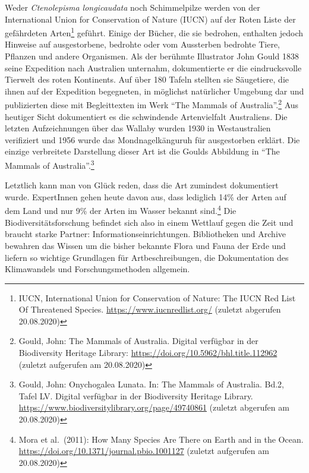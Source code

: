 \documentclass[a4paper,
fontsize=11pt,
oneside,
numbers=noperiodatend,
parskip=half-,
bibliography=totoc,
final
]{scrartcl}
\begin{document}
Weder \emph{Ctenolepisma longicaudata} noch Schimmelpilze werden von der
International Union for Conservation of Nature (IUCN) auf der Roten
Liste der gefährdeten Arten\footnote{IUCN, International Union for
  Conservation of Nature: The IUCN Red List Of Threatened Species.
  \url{https://www.iucnredlist.org/} (zuletzt abgerufen 20.08.2020)}
geführt. Einige der Bücher, die sie bedrohen, enthalten jedoch Hinweise
auf ausgestorbene, bedrohte oder vom Aussterben bedrohte Tiere, Pflanzen
und andere Organismen. Als der berühmte Illustrator John Gould 1838
seine Expedition nach Australien unternahm, dokumentierte er die
eindrucksvolle Tierwelt des roten Kontinents. Auf über 180 Tafeln
stellten sie Säugetiere, die ihnen auf der Expedition begegneten, in
möglichst natürlicher Umgebung dar und publizierten diese mit
Begleittexten im Werk \enquote{The Mammals of Australia}.\footnote{Gould,
  John: The Mammals of Australia. Digital verfügbar in der Biodiversity
  Heritage Library: \url{https://doi.org/10.5962/bhl.title.112962}
  (zuletzt aufgerufen am 20.08.2020)} Aus heutiger Sicht dokumentiert es
die schwindende Artenvielfalt Australiens. Die letzten Aufzeichnungen
über das Wallaby wurden 1930 in Westaustralien verifiziert und 1956
wurde das Mondnagelkänguruh für ausgestorben erklärt. Die einzige
verbreitete Darstellung dieser Art ist die Goulds Abbildung in
\enquote{The Mammals of Australia}.\footnote{Gould, John: Onychogalea
  Lunata. In: The Mammals of Australia. Bd.2, Tafel LV. Digital
  verfügbar in der Biodiversity Heritage Library.
  \url{https://www.biodiversitylibrary.org/page/49740861} (zuletzt
  abgerufen am 20.08.2020)}

Letztlich kann man von Glück reden, dass die Art zumindest dokumentiert
wurde. ExpertInnen gehen heute davon aus, dass lediglich 14\% der Arten
auf dem Land und nur 9\% der Arten im Wasser bekannt sind.\footnote{Mora
  et al.~(2011): How Many Species Are There on Earth and in the Ocean.
  \url{https://doi.org/10.1371/journal.pbio.1001127} (zuletzt aufgerufen
  am 20.08.2020)} Die Biodiversitätsforschung befindet sich also in
einem Wettlauf gegen die Zeit und braucht starke Partner:
Informationseinrichtungen. Bibliotheken und Archive bewahren das Wissen
um die bisher bekannte Flora und Fauna der Erde und liefern so wichtige
Grundlagen für Artbeschreibungen, die Dokumentation des Klimawandels und
Forschungsmethoden allgemein.
\end{document}
